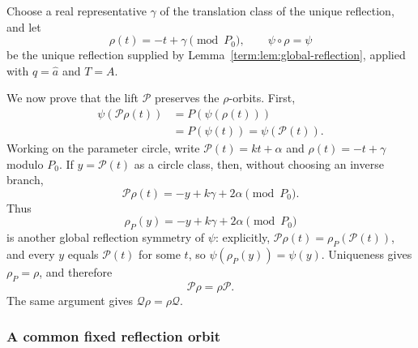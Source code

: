 \documentclass[11pt]{article}
\theoremstyle{definition}
\theoremstyle{remark}
\begin{document}
Choose a real representative \(\gamma\) of the translation class of the
unique reflection, and let
\begin{equation}\label{term:eq:reflection}
 \rho(t)=-t+\gamma\pmod{P_0},\qquad \psi\circ\rho=\psi
\end{equation}
be the unique reflection supplied by
Lemma~\ref{term:lem:global-reflection}, applied with
\(q=\widehat a\) and \(T=A\).

We now prove that the lift \(\mathcal P\) preserves the \(\rho\)-orbits.
First,
\[
\begin{split}
 \psi(\mathcal P\rho(t))
 &=P(\psi(\rho(t)))\\
 &=P(\psi(t))
 =\psi(\mathcal P(t)).
\end{split}
\]
Working on the parameter circle, write
\(\mathcal P(t)=kt+\alpha\) and \(\rho(t)=-t+\gamma\) modulo \(P_0\).
If \(y=\mathcal P(t)\) as a circle class, then, without choosing an inverse
branch,
\[
 \mathcal P\rho(t)=-y+k\gamma+2\alpha\pmod{P_0}.
\]
Thus
\[
 \rho_P(y)=-y+k\gamma+2\alpha\pmod{P_0}
\]
is another global reflection symmetry of \(\psi\): explicitly,
\(\mathcal P\rho(t)=\rho_P(\mathcal P(t))\), and every \(y\) equals
\(\mathcal P(t)\) for some \(t\), so \(\psi(\rho_P(y))=\psi(y)\).
Uniqueness gives \(\rho_P=\rho\), and therefore
\[
 \mathcal P\rho=\rho\mathcal P.
\]
The same argument gives \(\mathcal Q\rho=\rho\mathcal Q\).

\subsubsection{A common fixed reflection orbit}
\end{document}
